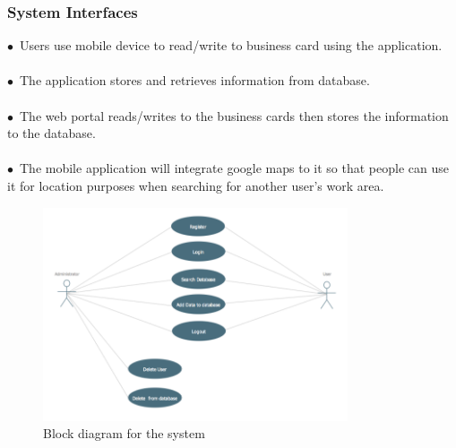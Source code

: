 \documentclass[english]{article}
\begin{document}
		\subsubsection{System Interfaces}

$\bullet$\ Users use mobile device to read/write to business card using the application.\\
\\$\bullet$\ The application stores and retrieves information from database.\\
\\$\bullet$\ The web portal reads/writes to the business cards then stores the information to the database.\\
\\$\bullet$\ The mobile application will integrate google maps to it so that people can use it for location purposes when searching for another user’s work area.

\begin{figure}[ht!]
\centering
\includegraphics[width=90mm]{system.png}
\caption{Block diagram for the system }
\end{figure}	
						
\end{document}
